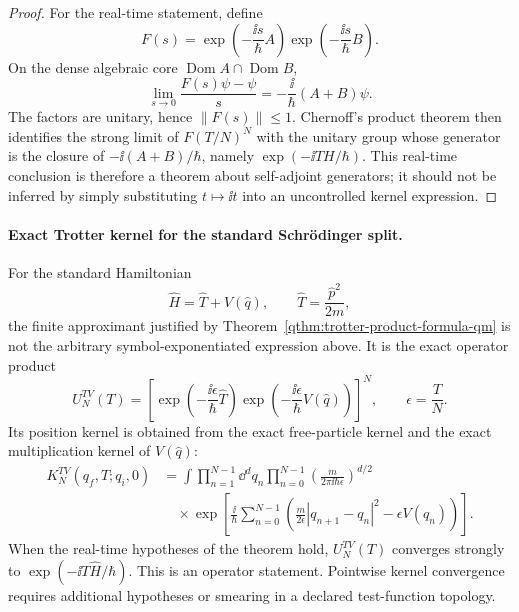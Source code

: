 \begin{proof}
For the real-time statement, define
\[
  F(s)=\exp\left(-\frac{\ii s}{\hbar}A\right)
       \exp\left(-\frac{\ii s}{\hbar}B\right).
\]
On the dense algebraic core
\(\operatorname{Dom}A\cap\operatorname{Dom}B\),
\[
  \lim_{s\to0}\frac{F(s)\psi-\psi}{s}
  =
  -\frac{\ii}{\hbar}(A+B)\psi .
\]
The factors are unitary, hence \(\|F(s)\|\le1\).  Chernoff's product theorem
then identifies the strong limit of \(F(T/N)^N\) with the unitary group whose
generator is the closure of \(-\ii(A+B)/\hbar\), namely
\(\exp(-\ii T H/\hbar)\).  This real-time conclusion is therefore a theorem
about self-adjoint generators; it should not be inferred by simply
substituting \(t\mapsto\ii t\) into an uncontrolled kernel expression.
\end{proof}

\paragraph{Exact Trotter kernel for the standard Schr\"odinger split.}
For the standard Hamiltonian
\[
  \widehat H=\widehat T+V(\widehat q),
  \qquad
  \widehat T=\frac{\widehat p^2}{2m},
\]
the finite approximant justified by
Theorem~\ref{qthm:trotter-product-formula-qm} is not the arbitrary
symbol-exponentiated expression above.  It is the exact operator product
\[
  U_N^{TV}(T)
  =
  \left[
    \exp\left(-\frac{\ii\epsilon}{\hbar}\widehat T\right)
    \exp\left(-\frac{\ii\epsilon}{\hbar}V(\widehat q)\right)
  \right]^N,
  \qquad \epsilon=\frac{T}{N}.
\]
Its position kernel is obtained from the exact free-particle kernel and the
exact multiplication kernel of \(V(\widehat q)\):
\[
\begin{aligned}
  K_N^{TV}(q_f,T;q_i,0)
  &=
  \int\prod_{n=1}^{N-1}\dd^dq_n
  \prod_{n=0}^{N-1}
  \left(\frac{m}{2\pi\ii\hbar\epsilon}\right)^{d/2}
  \\
  &\quad\times
  \exp\left[
    \frac{\ii}{\hbar}
    \sum_{n=0}^{N-1}
    \left(
      \frac{m}{2\epsilon}|q_{n+1}-q_n|^2
      -\epsilon V(q_n)
    \right)
  \right].
\end{aligned}
\]
When the real-time hypotheses of the theorem hold, \(U_N^{TV}(T)\) converges
strongly to \(\exp(-\ii T\widehat H/\hbar)\).  This is an operator statement.
Pointwise kernel convergence requires additional hypotheses or smearing in a
declared test-function topology.

